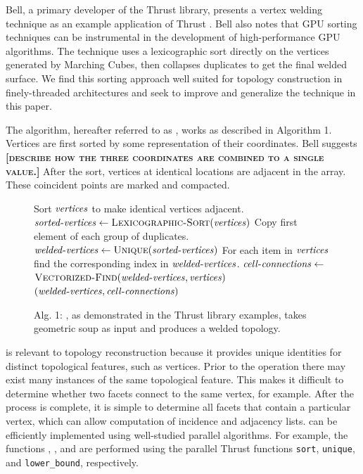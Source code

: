 \documentclass[10pt,journal,cspaper,compsoc]{IEEEtran}
\newcommand{\fix}[1]{{\color{red}\textbf{\textsc{[#1]}}}}
\begin{document}
Bell, a primary
developer of the Thrust library, presents a vertex welding technique as an
example application of Thrust \cite{Bell2010}. Bell also notes that GPU sorting techniques can
be instrumental in the development of high-performance GPU algorithms. The technique uses a
lexicographic sort directly on the vertices generated by Marching Cubes, then collapses 
duplicates to get the final welded surface.
We find this sorting approach well suited for topology construction in
finely-threaded architectures and seek to improve and generalize the
technique in this paper.

The algorithm, hereafter referred to as , works as
described in Algorithm 1.  Vertices are first sorted by some representation
of their coordinates.  Bell suggests \fix{describe how the three
  coordinates are combined to a single value.}  After the sort, vertices at
identical locations are adjacent in the array.  These coincident points are
marked and compacted.

\begin{figure}[h!]
\vspace{-0.3cm}
\begin{codebox}
  \zi \Comment Sort $\id{vertices}$ to make identical vertices adjacent.
  \li $\id{sorted-vertices} \gets \proc{Lexicographic-Sort}(\id{vertices})$
  \zi \Comment Copy first element of each group of duplicates.
  \li $\id{welded-vertices} \gets \proc{Unique}(\id{sorted-vertices})$
  \zi \Comment For each item in $\id{vertices}$ find the corresponding
  \zi \Comment index in $\id{welded-vertices}$.
  \li $\id{cell-connections} \gets$
  \zi \> $\proc{Vectorized-Find}(\id{welded-vertices},\id{vertices})$
  \li \Return $( \id{welded-vertices}, \id{cell-connections} )$
\end{codebox}
\vspace{-0.5cm}
\caption*{Alg. 1: , as demonstrated in the Thrust library examples, takes geometric soup as input and produces a welded topology.}
\end{figure}

 is relevant to topology reconstruction because it provides unique identities for distinct topological features, such as vertices. Prior to the operation there may exist many instances of the same topological feature. This makes it difficult to determine whether two facets connect to the same vertex, for example. After the  process is complete, it is simple to determine all facets that contain a particular vertex, which can allow computation of incidence and adjacency lists.   can be efficiently implemented using well-studied parallel algorithms.  For example, the functions ,
, and  are performed using the parallel
Thrust functions \texttt{sort}, \texttt{unique}, and \texttt{lower\_bound},
respectively.
\end{document}
